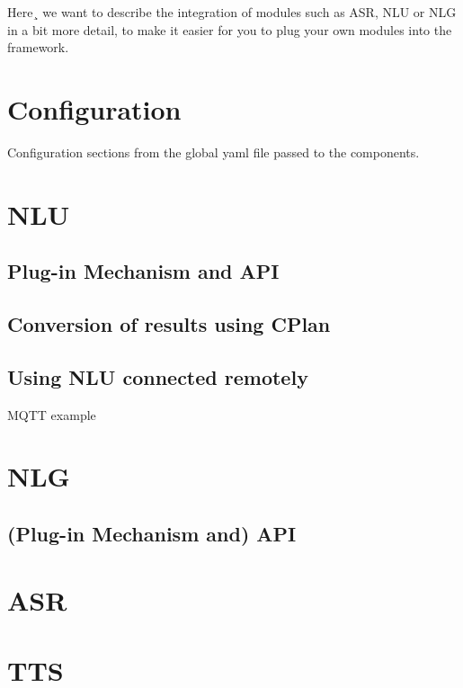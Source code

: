 Here¸ we want to describe the integration of modules such as ASR, NLU
or NLG in a bit more detail, to make it easier for you to plug your
own modules into the \vonda framework.


\section{Configuration}
Configuration sections from the global yaml file passed to the
components.

\section{NLU}
\subsection{Plug-in Mechanism and API}
\subsection{Conversion of results using CPlan}
\subsection{Using NLU connected remotely}
MQTT example

\section{NLG}
\subsection{(Plug-in Mechanism and) API}

\section{ASR}
\section{TTS}

